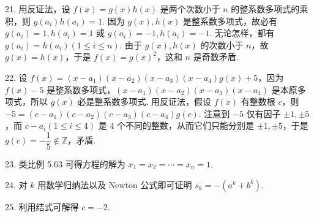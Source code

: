 \documentclass[UTF8, 12pt, fontset=fandol, oneside]{ctexart}
\begin{document}
21. 用反证法，设 $f(x)=g(x)h(x)$ 是两个次数小于 $n$ 的整系数多项式的乘积，则 $g(a_i)h(a_i)=1$. 因为 $g(x),h(x)$ 是整系数多项式，故必有 $g(a_i)=1,h(a_i)=1$ 或 $g(a_i)=-1,h(a_i)=-1$. 无论怎样，都有 $g(a_i)=h(a_i)(1\le i\le n)$. 由于 $g(x),h(x)$ 的次数小于 $n$，故 $g(x)=h(x)$，于是 $f(x)=g(x)^2$，这和 $n$ 是奇数矛盾.

22. 设 $f(x)=(x-a_1)(x-a_2)(x-a_3)(x-a_4)g(x)+5$，因为 $f(x)-5$ 是整系数多项式，$(x-a_1)(x-a_2)(x-a_3)(x-a_4)$ 是本原多项式，所以 $g(x)$ 必是整系数多项式. 用反证法，假设 $f(x)$ 有整数根 $c$，则 $-5=(c-a_1)(c-a_2)(c-a_3)(c-a_4)g(c)$. 注意到 $-5$ 仅有因子 $\pm1,\pm5$，而 $c-a_i(1\le i\le4)$ 是 4 个不同的整数，从而它们只能分别是 $\pm1,\pm5$，于是 $g(c)=-\dfrac{1}{5}\notin\mathbb{Z}$，矛盾.

23. 类比例 5.63 可得方程的解为 $x_1=x_2=\cdots=x_n=1$.

24. 对 $k$ 用数学归纳法以及 Newton 公式即可证明 $s_k=-(a^k+b^k)$.

25. 利用结式可解得 $c=-2$.
\end{document}
